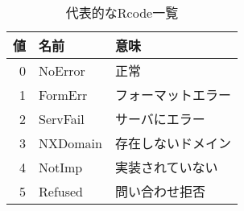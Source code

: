 \begin{table}[h]
 \caption{代表的なRcode一覧}
 \centering
  \begin{tabular}{rll}
    \toprule
    \textbf{値} & \textbf{名前} & \textbf{意味}\\
    \midrule
    0 & NoError & 正常\\
    1 & FormErr & フォーマットエラー\\
    2 & ServFail & サーバにエラー\\
    3 & NXDomain & 存在しないドメイン\\
    4 & NotImp & 実装されていない\\
    5 & Refused & 問い合わせ拒否\\
    \bottomrule
  \end{tabular}
 \label{tab:dns-rcode}
\end{table}
